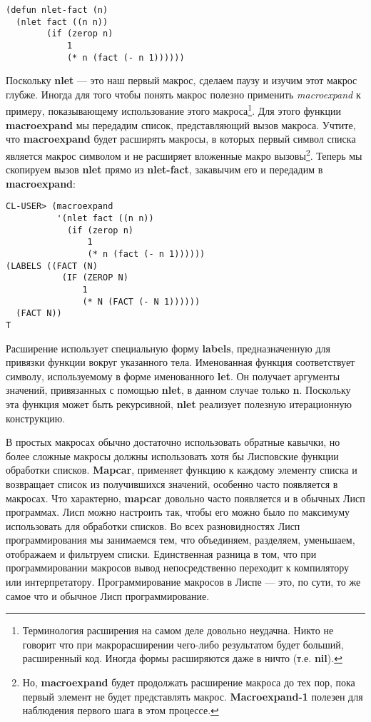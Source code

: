 \begin{verbatim}
(defun nlet-fact (n)
  (nlet fact ((n n))
        (if (zerop n)
            1
            (* n (fact (- n 1))))))
\end{verbatim}

Поскольку \textbf{nlet} --- это наш первый макрос, сделаем паузу и изучим этот макрос глубже. Иногда для того чтобы понять макрос полезно применить \emph{macroexpand} к примеру, показывающему использование этого макроса\footnote{Терминология расширения на самом деле довольно неудачна. Никто не говорит что при макрорасширении чего-либо результатом будет больший, расширенный код. Иногда формы расширяются даже в ничто (т.е. \textbf{nil}).}. Для этого функции \textbf{macroexpand} мы передадим список, представляющий вызов макроса. Учтите, что \textbf{macroexpand} будет расширять макросы, в которых первый символ списка является макрос символом и не расширяет вложенные макро вызовы\footnote{Но, \textbf{macroexpand} будет продолжать расширение макроса до тех пор, пока первый элемент не будет представлять макрос. \textbf{Macroexpand-1} полезен для наблюдения первого шага в этом процессе.}. Теперь мы скопируем вызов \textbf{nlet} прямо из \textbf{nlet-fact}, закавычим его и передадим в \textbf{macroexpand}:

\begin{verbatim}
CL-USER> (macroexpand
          '(nlet fact ((n n))
            (if (zerop n)
                1
                (* n (fact (- n 1))))))
(LABELS ((FACT (N)
           (IF (ZEROP N)
               1
               (* N (FACT (- N 1))))))
  (FACT N))
T
\end{verbatim}

Расширение использует специальную форму \textbf{labels}, предназначенную для привязки функции вокруг указанного тела. Именованная функция соответствует символу, используемому в форме именованного \textbf{let}. Он получает аргументы значений, привязанных с помощью \textbf{nlet}, в данном случае только \textbf{n}. Поскольку эта функция может быть рекурсивной, \textbf{nlet} реализует полезную итерационную конструкцию.

В простых макросах обычно достаточно использовать обратные кавычки, но более сложные макросы должны использовать хотя бы Лисповские функции обработки списков. \textbf{Mapcar}, применяет функцию к каждому элементу списка и возвращает список из получившихся значений, особенно часто появляется в макросах. Что характерно, \textbf{mapcar} довольно часто появляется и в обычных Лисп программах. Лисп можно настроить так, чтобы его можно было по максимуму использовать для обработки списков. Во всех разновидностях Лисп программирования мы занимаемся тем, что объединяем, разделяем, уменьшаем, отображаем и фильтруем списки. Единственная разница в том, что при программировании макросов вывод непосредственно переходит к компилятору или интерпретатору. Программирование макросов в Лиспе --- это, по сути, то же самое что и обычное Лисп программирование.

